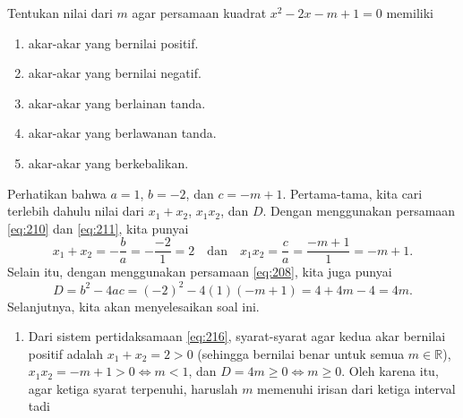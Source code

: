 	\begin{contoh}
		Tentukan nilai dari $ m $ agar persamaan kuadrat $ x^{2} - 2x - m + 1 = 0 $ memiliki
		\begin{enumerate}
			\item akar-akar yang bernilai positif.
			\item akar-akar yang bernilai negatif.
			\item akar-akar yang berlainan tanda.
			\item akar-akar yang berlawanan tanda.
			\item akar-akar yang berkebalikan.
		\end{enumerate}
	\end{contoh}
	\begin{jawab}
		Perhatikan bahwa $ a = 1 $, $ b = -2 $, dan $ c = -m + 1 $. Pertama-tama, kita cari terlebih dahulu nilai dari $ x_{1} + x_{2} $, $ x_{1}x_{2} $, dan $ D $. Dengan menggunakan persamaan \ref{eq:210} dan \ref{eq:211}, kita punyai
		\[ x_{1} + x_{2} = -\frac{b}{a} = -\frac{-2}{1} = 2 \quad \mbox{dan} \quad x_{1}x_{2} = \frac{c}{a} = \frac{-m + 1}{1} = -m + 1. \]
		Selain itu, dengan menggunakan persamaan \ref{eq:208}, kita juga punyai
		\[ D = b^{2} - 4ac = \left(-2\right)^{2} - 4\left(1\right)\left(-m + 1\right) = 4 + 4m - 4 = 4m. \]
		Selanjutnya, kita akan menyelesaikan soal ini.
		\begin{enumerate}
			\item Dari sistem pertidaksamaan \ref{eq:216}, syarat-syarat agar kedua akar bernilai positif adalah $ x_{1} + x_{2} = 2 > 0 $ (sehingga bernilai benar untuk semua $ m \in \mathbb{R} $), $ x_{1}x_{2} = -m + 1 > 0 \iff m < 1 $, dan $ D = 4m \geq 0 \iff m \geq 0 $. Oleh karena itu, agar ketiga syarat terpenuhi, haruslah $ m $ memenuhi irisan dari ketiga interval tadi
			\begin{minipage}[t]{\linewidth}
				\begin{figure}[H]
					\centering
\end{figure}
\end{minipage}
\end{enumerate}
\end{jawab}
